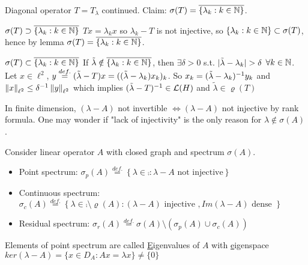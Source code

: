 \begin{example}\nl
	Diagonal operator $T=T_\lambda$ continued. Claim: $\sigma(T)=\overline{\{\lambda_k:k\in\mathbb{N}\}}$.
	\begin{pf}{$\sigma(T)\supset\overline{\{\lambda_k:k\in\mathbb{N}\}}$}{}
		$Tx=\lambda_k x$ so $\lambda_k-T$ is not injective, so $\{\lambda_k:k\in\mathbb{N}\}\subset\sigma(T)$, hence by lemma $\sigma(T)=\overline{\{\lambda_k:k\in\mathbb{N}\}}$.
	\end{pf}

	\begin{pf}{$\sigma(T)\subset\overline{\{\lambda_k:k\in\mathbb{N}\}}$}{}
		If $\Tilde{\lambda}\notin\overline{\{\lambda_k:k\in\mathbb{N}\}}$, then $\exists\delta>0$ s.t. $|\Tilde{\lambda}-\lambda_k|>\delta$ $\forall k\in\mathbb{N}$. Let $x\in\ell^2$, $y\stackrel{def.}{=}(\Tilde{\lambda}-T)x=((\Tilde{\lambda}-\lambda_k)x_k)_k$. So $x_k=(\Tilde{\lambda}-\lambda_k)^{-1}y_k$ and $\left\|{x}\right\|_{\ell^2}\leq\delta^{-1}\left\|{y}\right\|_{\ell^2}$ which implies $(\Tilde{\lambda}-T)^{-1}\in\mathcal{L}(H)$ and $\tilde{\lambda}\in\varrho(T)$
	\end{pf}
\end{example}

\begin{remark}\nl
	In finite dimension, $(\lambda-A)$ not invertible $\iff(\lambda-A)$ not injective by rank formula. One may wonder if "lack of injectivity" is the only reason for $\lambda\notin \sigma(A)$.
\end{remark}

\begin{definition}\nl
	Consider linear operator $A$ with closed graph and spectrum $\sigma(A)$.
	\begin{itemize}
		\item Point spectrum: $\sigma_p(A)\stackrel{def.}{=}
			      \left\{
			      \lambda\in \comp :\lambda-A \text{ not  injective}
			      \right\}$
		\item Continuous spectrum: $\sigma_c(A)\stackrel{def.}{=}
			      \left\{
			      \lambda\in\comp\setminus\varrho(A):(\lambda-A) \text{ injective }, Im(\lambda-A) \text{ dense }
			      \right\}$
		\item Residual spectrum:  $\sigma_r(A)\stackrel{def.}{=}\sigma(A)\setminus(
			      \sigma_p(A)\cup\sigma_c(A))$
	\end{itemize}
	Elements of point spectrum are called {\underline Eigenvalues of $A$} with {\underline eigenspace} $ker(\lambda-A)=\{x\in D_A:Ax=\lambda x\}\neq\{0\}$

\end{definition}

